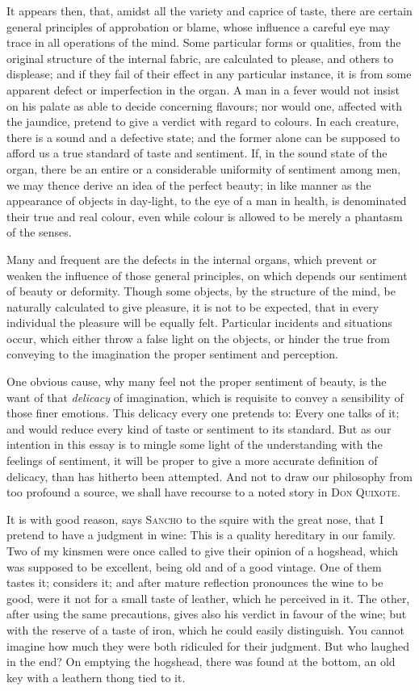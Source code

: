 It appears then, that, amidst all the variety and caprice of taste,
there are certain general principles of approbation or blame, whose
influence a careful eye may trace in all operations of the mind. Some
particular forms or qualities, from the original structure of the
internal fabric, are calculated to please, and others to displease;
and if they fail of their effect in any particular instance, it is
from some apparent defect or imperfection in the organ. A man in a
fever would not insist on his palate as able to decide concerning
flavours; nor would one, affected with the jaundice, pretend to give a
verdict with regard to colours. In each creature, there is a
 sound and a defective state; and the former alone can be
supposed to afford us a true standard of taste and sentiment. If, in
the sound state of the organ, there be an entire or a considerable
uniformity of sentiment among men, we may thence derive an idea of the
perfect beauty; in like manner as the appearance of objects in
day-light, to the eye of a man in health, is denominated their true
and real colour, even while colour is allowed to be merely a phantasm
of the senses.

Many and frequent are the defects in the internal organs, which
prevent or weaken the influence of those general principles, on which
depends our sentiment of beauty or deformity. Though some objects, by
the structure of the mind, be naturally calculated to give pleasure,
it is not to be expected, that in every individual the pleasure will
be equally felt. Particular incidents and situations occur, which
either throw a false light on the objects, or hinder the true from
conveying to the imagination the proper sentiment and perception.

One obvious cause, why many feel not the proper sentiment of beauty,
is the want of that \textit{delicacy} of imagination, which is
requisite to convey a sensibility of those finer emotions. This
delicacy every one pretends to: Every one talks of it; and would
reduce every kind of taste or sentiment to its standard. But as our
intention in this essay is to mingle some light of the understanding
with the feelings of sentiment, it will be proper to give a more
accurate definition of delicacy, than has hitherto been attempted. And
not to draw our philosophy from too profound a source, we shall have
recourse to a noted story in \textsc{Don Quixote}.

It is with good reason, says \textsc{Sancho} to the squire with the
great nose, that I pretend to have a judgment in wine: This is a
quality hereditary in our family. Two of my kinsmen were once called
to give their opinion of a hogshead, which was supposed to be
excellent, being old and of a good vintage. One of them tastes it;
considers it; and after mature reflection pronounces the wine to be
good, were it not for a small taste of leather, which he perceived
in it. The other, after using the same precautions, gives also his
verdict in favour of the wine; but with the reserve of a taste of
iron, which he could easily distinguish. You cannot imagine how much
they were both ridiculed for their judgment. But who laughed in the
end? On emptying the hogshead, there was found at the bottom, an old
key with a leathern thong tied to it.

